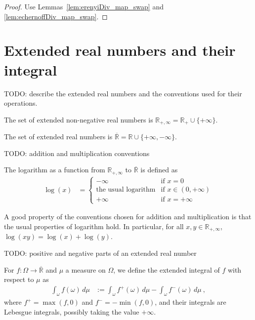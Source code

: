 \begin{proof}\leanok
Use Lemmas~\ref{lem:erenyiDiv_map_swap} and \ref{lem:echernoffDiv_map_swap}.
\end{proof}


\chapter{Extended real numbers and their integral}

TODO: describe the extended real numbers and the conventions used for their operations.

\begin{definition}\label{def:ENNReal}
  \mathlibok
The set of extended non-negative real numbers is $\mathbb{R}_{+,\infty} = \mathbb{R}_{+} \cup \{+\infty\}$.
\end{definition}

\begin{definition}\label{def:EReal}
  \mathlibok
The set of extended real numbers is $\overline{\mathbb{R}} = \mathbb{R} \cup \{+\infty, -\infty\}$.
\end{definition}

TODO: addition and multiplication conventions

\begin{definition}\label{def:ENNReal.log}
  \mathlibok
The logarithm as a function from $\mathbb{R}_{+, \infty}$ to $\overline{\mathbb{R}}$ is defined as
\begin{align*}
  \log(x)
  &= \begin{cases}
    -\infty & \text{if } x = 0 \\
    \text{the usual logarithm} & \text{if } x \in (0, +\infty) \\
    +\infty & \text{if } x = +\infty
  \end{cases}
\end{align*}
\end{definition}

A good property of the conventions chosen for addition and multiplication is that the usual properties of logarithm hold.
In particular, for all $x, y \in \mathbb{R}_{+, \infty}$, $\log(xy) = \log(x) + \log(y)$.

TODO: positive and negative parts of an extended real number

\begin{definition}\label{def:eintegral}
  \leanok
For $f : \Omega \to \overline{\mathbb{R}}$ and $\mu$ a measure on $\Omega$, we define the extended integral of $f$ with respect to $\mu$ as
\begin{align*}
  \int_{\omega} f (\omega) \, d\mu
  &:= \int_{\omega} f^{+} (\omega) \, d\mu - \int_{\omega} f^{-} (\omega) \, d\mu
  \: ,
\end{align*}
where $f^{+} = \max(f, 0)$ and $f^{-} = -\min(f, 0)$, and their integrals are Lebesgue integrals, possibly taking the value $+\infty$.
\end{definition}


